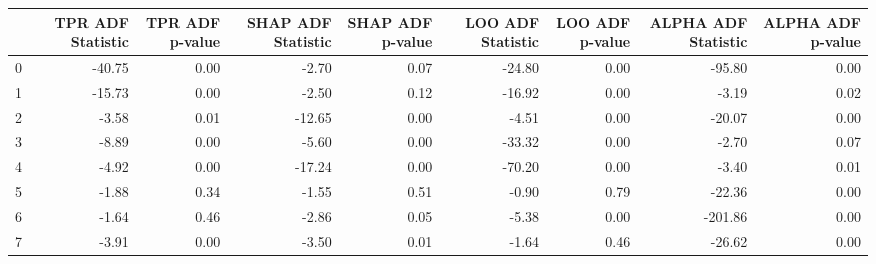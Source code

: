 \begin{tabular}{lrrrrrrrr}
\toprule
 & TPR ADF Statistic & TPR ADF p-value & SHAP ADF Statistic & SHAP ADF p-value & LOO ADF Statistic & LOO ADF p-value & ALPHA ADF Statistic & ALPHA ADF p-value \\
\midrule
0 & -40.75 & 0.00 & -2.70 & 0.07 & -24.80 & 0.00 & -95.80 & 0.00 \\
1 & -15.73 & 0.00 & -2.50 & 0.12 & -16.92 & 0.00 & -3.19 & 0.02 \\
2 & -3.58 & 0.01 & -12.65 & 0.00 & -4.51 & 0.00 & -20.07 & 0.00 \\
3 & -8.89 & 0.00 & -5.60 & 0.00 & -33.32 & 0.00 & -2.70 & 0.07 \\
4 & -4.92 & 0.00 & -17.24 & 0.00 & -70.20 & 0.00 & -3.40 & 0.01 \\
5 & -1.88 & 0.34 & -1.55 & 0.51 & -0.90 & 0.79 & -22.36 & 0.00 \\
6 & -1.64 & 0.46 & -2.86 & 0.05 & -5.38 & 0.00 & -201.86 & 0.00 \\
7 & -3.91 & 0.00 & -3.50 & 0.01 & -1.64 & 0.46 & -26.62 & 0.00 \\
\bottomrule
\end{tabular}
